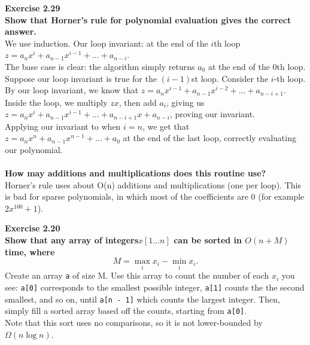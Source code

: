 \documentclass{article}
\newenvironment{problem}[2][Exercise]
    { \begin{mdframed}[backgroundcolor=gray!20] \textbf{#1 #2} \\}
    {  \end{mdframed}}
\begin{document}
\begin{problem}{2.29}
    \textbf{Show that Horner's rule for polynomial evaluation gives the correct answer.}
    \\
    We use induction. Our loop invariant: at the end of the $i$th loop 
    $z = a_nx^i + a_{n - 1}x^{i - 1} + ... + a_{n - i}$.
    \\
    The base case is clear: the algorithm simply returns $a_0$ at the end of the 0th loop.
    \\
    Suppose our loop invariant is true for the $(i - 1)$st loop. Consider the $i$-th loop. By our loop invariant, we know that $z = a_nx^{i - 1}+ a_{n - 1}x^{i - 2} + ... + a_{n - i + 1}$. Inside the loop, we multiply $zx$, then add $a_{i}$, giving us $z = a_nx^i + a_{n - 1}x^{i - 1} + ... + a_{n - i + 1}x + a_{n - i}$, proving our invariant.
    \\
    Applying our invariant to when $i = n$, we get that $z = a_nx^n + a_{n - 1}x^{n - 1} + ... + a_0$ at the end of the last loop, correctly evaluating our polynomial.
    \\ \\
    \textbf{How may additions and multiplications does this routine use?}
    \\
    Horner's rule uses about O(n) additions and multiplications (one per loop). This is bad for sparse polynomials, in which most of the coefficients are 0 (for example $2x^{100} + 1$).
\end{problem}

\begin{problem}{2.20}
\textbf{Show that any array of integers$x[1...n]$ can be sorted in $O(n + M)$ time, where}
    \[
    M = \max_i x_i - \min_i x_i.
    \]
    Create an array \texttt{a} of size M. Use this array to count the number of each $x_i$ you see: \texttt{a[0]} corresponds to the smallest possible integer, \texttt{a[1]} counts the the second smallest, and so on, until \texttt{a[n - 1]} which counts the largest integer. Then, simply fill a sorted array based off the counts, starting from \texttt{a[0]}.
    \\
    Note that this sort uses no comparisons, so it is not lower-bounded by $\Omega(n \log n)$.
\end{problem}
\end{document}
